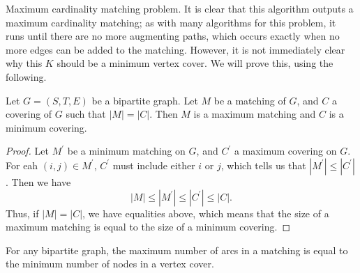 \documentclass[11pt]{article}
\renewcommand{\'}{^{'}}
\newenvironment{theorem}[2][Theorem]{\begin{trivlist}
\item[\hskip \labelsep {\bfseries #1}\hskip \labelsep {\bfseries #2.}]}{\end{trivlist}}
\newenvironment{lemma}[2][Lemma]{\begin{trivlist}
\item[\hskip \labelsep {\bfseries #1}\hskip \labelsep {\bfseries #2.}]}{\end{trivlist}}
\begin{document}
\begin{section}{Maximum cardinality matching problem.}
It is clear that this algorithm outputs a maximum cardinality matching; as with many 
algorithms for this problem, it runs until there are no more augmenting paths, which 
occurs exactly when no more edges can be added to the matching. However, it is not 
immediately clear why this $K$ should be a minimum vertex cover. We will prove this, 
using the following.

\begin{lemma}{}
	Let $G = (S, T, E)$ be a bipartite graph. Let $M$ be a matching of $G$, and $C$ a 
	covering of $G$ such that $|M| = |C|$. Then $M$ is a maximum matching and $C$ is a 
	minimum covering.
\end{lemma}

\begin{proof}
	Let $M^{'}$ be a minimum matching on $G$, and $C^{'}$ a maximum covering on $G$. 
	For eah $(i,j)\in M^{'}$, $C^{'}$ must include either $i$ or $j$, which tells 
	us that $|M^{'}| \leq |C^{'}|$. Then we have 
	\[
		|M|\leq |M^{'}| \leq |C^{'}|\leq |C|.
	\]
	Thus, if $|M| = |C|$, we have equalities above, which means that the size of 
	a maximum matching is equal to the size of a minimum covering.
\end{proof}

\begin{theorem}{(K\H{o}nig-Egervary)}
	For any bipartite graph, the maximum number of arcs in a matching is equal to 
	the minimum number of nodes in a vertex cover.
\end{theorem}


\end{section}
\end{document}

